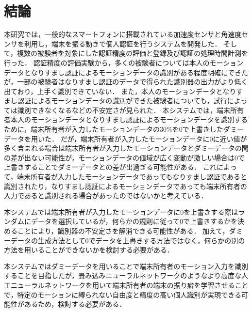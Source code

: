 \chapter{結論}
本研究では，一般的なスマートフォンに搭載されている加速度センサと角速度センサを利用し，端末を振る動きで個人認証を行うシステムを開発した．
そして，複数の被験者を対象にした認証精度の評価と登録及び認証の処理時間計測を行った．
認証精度の評価実験から，多くの被験者については本人のモーションデータとなりすまし認証によるモーションデータの識別がある程度明確にできたが，一部の被験者はなりすまし認証のデータで得られた識別器の出力がより低く出ており，上手く識別できていない．
また，本人のモーションデータとなりすまし認証によるモーションデータの識別ができた被験者についても，試行によっては識別できなくなるなどの不安定さが見られた．
本システムでは，端末所有者本人のモーションデータとなりすまし認証によるモーションデータを識別するために，端末所有者が入力したモーションデータの30\%を0で上書きしたダミーデータを用いた．
だが，端末所有者が入力したモーションデータに0に近い値が多く含まれる場合は端末所有者が入力したモーションデータとダミーデータの間の差が出ない可能性が，モーションデータの値域が広く変動が激しい場合は0で上書きすることでダミーデータとの差が出過ぎる可能性がある．
これによって，端末所有者が入力したモーションデータであってもなりすまし認証であると識別されたり，なりすまし認証によるモーションデータであっても端末所有者の入力であると識別される場合があったのではないかと考えている．

本システムでは端末所有者が入力したモーションデータに0を上書きする際はランダムにデータを選択しているが，何らかの規則に従って0で上書きするかを決めることにより，識別器の不安定さを解消できる可能性がある．
加えて，ダミーデータの生成方法として0でデータを上書きする方法ではなく，何らかの別の方法を用いることができないかを検討する必要がある．

本システムではダミーデータを用いることで端末所有者のモーション入力を識別することを目指したが，畳み込みニューラルネットワークのようなより高度な人工ニューラルネットワークを用いて端末所有者の端末の振り癖を学習させることで，特定のモーションに縛られない自由度と精度の高い個人識別が実現できる可能性があるため，検討する必要がある．
